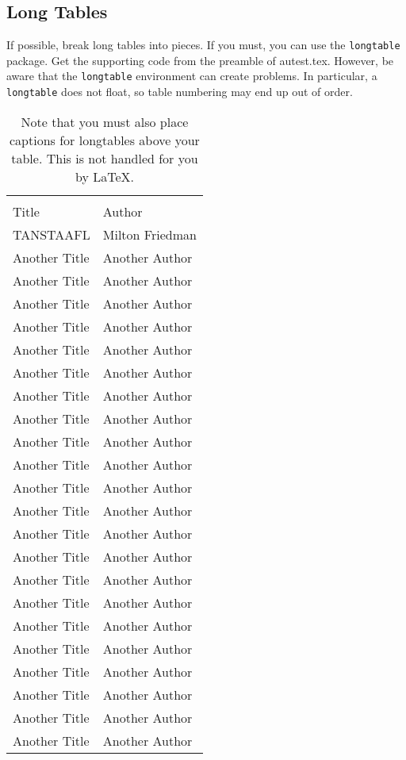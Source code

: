 \documentclass[12pt,econ]{sources/authesis}
\theoremstyle{definition}
\theoremstyle{definition}
\theoremstyle{definition}
\theoremstyle{remark}
\begin{document}
\subsection{Long Tables}\label{long-tables}

If possible, break long tables into pieces. If you must, you can use the
\texttt{longtable} package. Get the supporting code from the preamble of
autest.tex. However, be aware that the \texttt{longtable} environment
can create problems. In particular, a \texttt{longtable} does not float,
so table numbering may end up out of order.
\begin{center}
\begin{longtable}{ll}\hline\hline
\caption{Note that you must also place captions for longtables above your table.
This is not handled for you by \LaTeX.}
\\
Title & Author \\ \hline
TANSTAAFL & Milton Friedman \\
Another Title & Another Author \\
Another Title & Another Author \\
Another Title & Another Author \\
Another Title & Another Author \\
Another Title & Another Author \\
Another Title & Another Author \\
Another Title & Another Author \\
Another Title & Another Author \\
Another Title & Another Author \\
Another Title & Another Author \\
Another Title & Another Author \\
Another Title & Another Author \\
Another Title & Another Author \\
Another Title & Another Author \\
Another Title & Another Author \\
Another Title & Another Author \\
Another Title & Another Author \\
Another Title & Another Author \\
Another Title & Another Author \\
Another Title & Another Author \\
Another Title & Another Author \\
Another Title & Another Author \\

\end{longtable}
\end{center}
\end{document}
